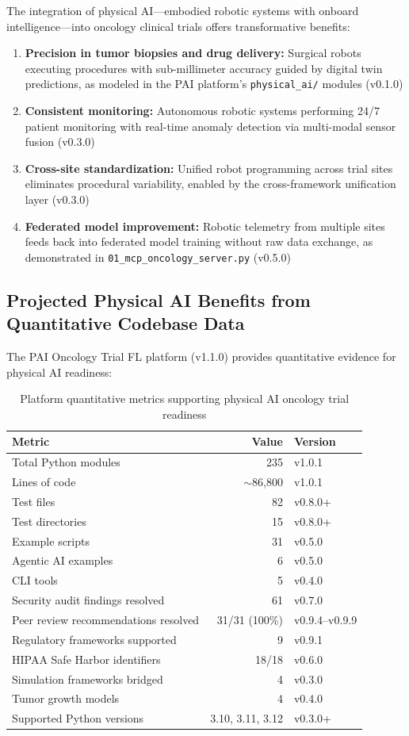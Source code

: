 \documentclass[10pt]{article}
\begin{document}
The integration of physical AI---embodied robotic systems with onboard intelligence---into oncology clinical trials offers transformative benefits:
\begin{enumerate}
  \item \textbf{Precision in tumor biopsies and drug delivery:} Surgical robots executing procedures with sub-millimeter accuracy guided by digital twin predictions, as modeled in the PAI platform's \texttt{physical\_ai/} modules (v0.1.0)
  \item \textbf{Consistent monitoring:} Autonomous robotic systems performing 24/7 patient monitoring with real-time anomaly detection via multi-modal sensor fusion (v0.3.0)
  \item \textbf{Cross-site standardization:} Unified robot programming across trial sites eliminates procedural variability, enabled by the cross-framework unification layer (v0.3.0)
  \item \textbf{Federated model improvement:} Robotic telemetry from multiple sites feeds back into federated model training without raw data exchange, as demonstrated in \texttt{01\_mcp\_oncology\_server.py} (v0.5.0)
\end{enumerate}

\subsection{Projected Physical AI Benefits from Quantitative Codebase Data}

The PAI Oncology Trial FL platform (v1.1.0) provides quantitative evidence for physical AI readiness:

\begin{table}[H]
\centering
\caption{Platform quantitative metrics supporting physical AI oncology trial readiness}
\label{tab:quantitative}
\small
\begin{tabular}{@{}lrl@{}}
\toprule
\textbf{Metric} & \textbf{Value} & \textbf{Version} \\
\midrule
Total Python modules & 235 & v1.0.1 \\
Lines of code & $\sim$86,800 & v1.0.1 \\
Test files & 82 & v0.8.0+ \\
Test directories & 15 & v0.8.0+ \\
Example scripts & 31 & v0.5.0 \\
Agentic AI examples & 6 & v0.5.0 \\
CLI tools & 5 & v0.4.0 \\
Security audit findings resolved & 61 & v0.7.0 \\
Peer review recommendations resolved & 31/31 (100\%) & v0.9.4--v0.9.9 \\
Regulatory frameworks supported & 9 & v0.9.1 \\
HIPAA Safe Harbor identifiers & 18/18 & v0.6.0 \\
Simulation frameworks bridged & 4 & v0.3.0 \\
Tumor growth models & 4 & v0.4.0 \\
Supported Python versions & 3.10, 3.11, 3.12 & v0.3.0+ \\
\bottomrule
\end{tabular}
\end{table}
\end{document}
